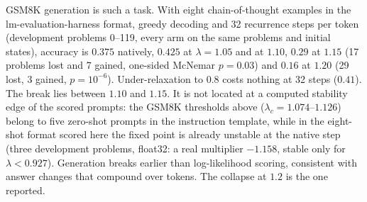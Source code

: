 \documentclass[11pt,letterpaper]{article}
\begin{document}
GSM8K generation is such a task. With eight chain-of-thought examples in the lm-evaluation-harness format, greedy
decoding and 32 recurrence steps per token (development problems 0--119, every arm on the same problems and initial
states), accuracy is $0.375$ natively, $0.425$ at $\lambda=1.05$ and at $1.10$, $0.29$ at $1.15$ (17 problems lost and
7 gained, one-sided McNemar $p=0.03$) and $0.16$ at $1.20$ (29 lost, 3 gained, $p=10^{-6}$). Under-relaxation to
$0.8$ costs nothing at 32 steps ($0.41$). The break lies between $1.10$ and $1.15$. It is not located at a computed
stability edge of the scored prompts: the GSM8K thresholds above ($\lambda_c=1.074$--$1.126$) belong to five zero-shot
prompts in the instruction template, while in the eight-shot format scored here the fixed point is already unstable
at the native step (three development problems, float32: a real multiplier $-1.158$, stable only for
$\lambda<0.927$). Generation breaks earlier than log-likelihood scoring, consistent with answer changes that
compound over tokens. The collapse at $1.2$ is the one \citet{wang2026taps} reported.
\end{document}
